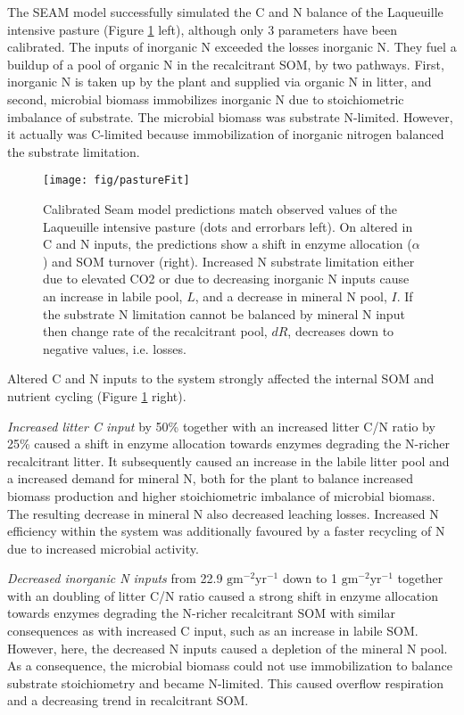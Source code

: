 The SEAM model successfully simulated the C and N balance of the Laqueuille
intensive pasture (Figure \ref{fig:pastureFit} left), although only 3 parameters
have been calibrated.
The inputs of inorganic N exceeded the losses inorganic N. They fuel a buildup
of a pool of organic N in the recalcitrant SOM, by two pathways. First,
inorganic N is taken up by the plant and supplied via organic N in litter, and
second, microbial biomass immobilizes inorganic N due to stoichiometric
imbalance of substrate. The microbial biomass was substrate N-limited. However,
it actually was C-limited because immobilization of inorganic nitrogen balanced
the substrate limitation. 

\begin{figure}[t] \vspace*{2mm}
\label{fig:pastureFit}
\begin{center}
\texttt{[image: fig/pastureFit]} 
\end{center}
\caption{Calibrated Seam model predictions match observed values of the
Laqueuille intensive pasture (dots and errorbars left). On altered in C and N
inputs, the predictions show a shift in enzyme allocation ($\alpha$) and SOM
turnover (right).
Increased N substrate limitation either due to elevated CO2 or due to
decreasing inorganic N inputs cause an increase in labile pool, $L$, and a
decrease in mineral N pool, $I$. If the substrate N limitation cannot be balanced by mineral N
input then change rate of the recalcitrant pool, $dR$, decreases down to
negative values, i.e. losses.
}
\end{figure}   

Altered C and N inputs to the system strongly affected the internal SOM and
nutrient cycling (Figure \ref{fig:pastureFit} right). 

\textit{Increased litter C input} by 50\% together with an increased litter
C/N ratio by 25\% caused a shift in enzyme allocation towards enzymes degrading the
N-richer recalcitrant litter. It subsequently caused an increase in the
labile litter pool and a increased demand for mineral N, both for 
the plant to balance increased biomass production and higher stoichiometric
imbalance of microbial biomass. The resulting decrease in mineral N also
decreased leaching losses. Increased N efficiency within the system was
additionally favoured by a faster recycling of N due to increased
microbial activity. 

\textit{Decreased inorganic N inputs} from 22.9
${\textrm{gm}^{-2}\textrm{yr}^{-1}}$ down to 1
${\textrm{gm}^{-2}\textrm{yr}^{-1}}$ together with an doubling of litter C/N
ratio caused a strong shift in enzyme allocation towards enzymes degrading the
N-richer recalcitrant SOM with similar consequences as with increased C input,
such as an increase in labile SOM. However, here, the decreased N inputs caused
a depletion of the mineral N pool.
As a consequence, the microbial biomass could not use immobilization to
balance substrate stoichiometry and became N-limited.
This caused overflow respiration and a decreasing trend in recalcitrant SOM.

